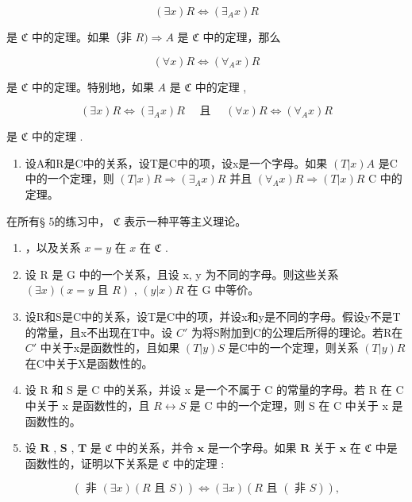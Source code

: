 \[
(\exists x) R \Longleftrightarrow (\exists_ {A} x) R
\]

是 \(\mathfrak{C}\) 中的定理。如果（非 \(R) \Longrightarrow A\) 是 \(\mathfrak{C}\) 中的定理，那么

\[
(\forall x) R \Longleftrightarrow (\forall_ {A} x) R
\]

是 \(\mathfrak{C}\) 中的定理。特别地，如果 \(A\) 是 \(\mathfrak{C}\) 中的定理 ,

\[
(\exists x) R \Longleftrightarrow (\exists_ {A} x) R \quad \text { 且 } \quad (\forall x) R \Longleftrightarrow (\forall_ {A} x) R
\]

是 \(\mathfrak{C}\) 中的定理 .

\begin{enumerate}
\def\labelenumi{\arabic{enumi}.}
\setcounter{enumi}{7}
\tightlist
\item
  设A和R是C中的关系，设T是C中的项，设x是一个字母。如果 \((T|x)A\) 是C中的一个定理，则 \((T|x)R \Longrightarrow (\exists_{A}x)R\) 并且 \((\forall_{A}x)R \Longrightarrow (T|x)R\) C 中的定理。
\end{enumerate}

\exercisegroup

在所有§ 5的练习中， \(\mathfrak{C}\) 表示一种平等主义理论。

\begin{enumerate}
\def\labelenumi{\arabic{enumi}.}
\item
  ，以及关系 \(x = y\) 在 \(x\) 在 \(\mathfrak{C}\) .
\item
  设 R 是 G 中的一个关系，且设 x, y 为不同的字母。则这些关系 \((\exists x)(x = y \text{ 且 } R)\) , \((y|x)R\) 在 G 中等价。
\item
  设R和S是C中的关系，设T是C中的项，并设x和y是不同的字母。假设y不是T的常量，且x不出现在T中。设 \(C'\) 为将S附加到C的公理后所得的理论。若R在 \(C'\) 中关于x是函数性的，且如果 \((T|y)S\) 是C中的一个定理，则关系 \((T|y)R\) 在C中关于X是函数性的。
\item
  设 R 和 S 是 C 中的关系，并设 x 是一个不属于 C 的常量的字母。若 R 在 C 中关于 x 是函数性的，且 \(R \leftrightarrow S\) 是 C 中的一个定理，则 S 在 C 中关于 x 是函数性的。
\item
  设 \(\pmb{R}\) , \(\pmb{S}\) , \(\pmb{T}\) 是 \(\mathfrak{C}\) 中的关系，并令 \(\pmb{x}\) 是一个字母。如果 \(\pmb{R}\) 关于 \(\pmb{x}\) 在 \(\mathfrak{C}\) 中是函数性的，证明以下关系是 \(\mathfrak{C}\) 中的定理 :
\end{enumerate}

\[
(\text { 非   } (\exists x) (R \text {   且   } S)) \iff (\exists x) (R \text {   且   } (\text { 非   } S)),
\]

